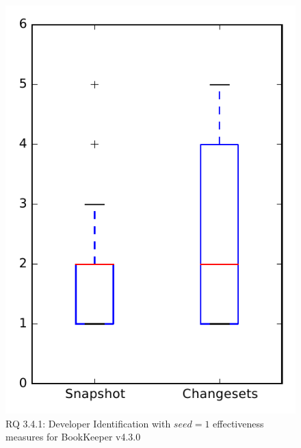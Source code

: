 
\begin{figure}
\centering
\includegraphics[height=0.4\textheight]{figures/dit_seed/rq1_bookkeeper_1}
\caption{RQ 3.4.1: Developer Identification with $seed=1$ effectiveness measures for BookKeeper v4.3.0}
\label{fig:dit_seed:rq1:bookkeeper}
\end{figure}
